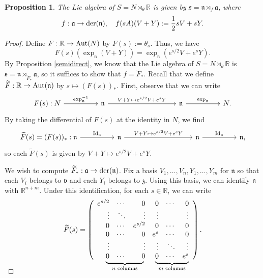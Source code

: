 \documentclass{amsart}
\newcommand{\R}{\mathbb R}
\newcommand{\id}{\text{\normalfont Id}}
\newcommand{\der}{\text{\normalfont der}}
\newcommand{\aut}{\text{\normalfont Aut}}
\newcommand{\s}{\mathfrak s}
\renewcommand{\v}{\mathfrak v}
\newcommand{\z}{\mathfrak z}
\newcommand{\n}{\mathfrak n}
\renewcommand{\a}{\mathfrak a}
\theoremstyle{plain}
\newtheorem{proposition}[theorem]{Proposition}
\theoremstyle{definition}
\theoremstyle{remark}
\newcommand\undermat[2]{%
	\makebox[0pt][l]{$\smash{\underbrace{\phantom{%
					\begin{matrix}#2\end{matrix}}}_{\text{$#1$}}}$}#2}
\begin{document}
	 \begin{proposition}
	 	\label{semidirect product}
	 	The Lie algebra of $S= N \rtimes_\theta \R$ is given by $\s = \n \rtimes_{f} \a$, where 
	 	$$f:\a \rightarrow \der(\n), \quad f(sA)(V+Y) := \frac12 sV + sY.$$
	 \end{proposition}
	 \begin{proof}
	 	Define $F:\R \rightarrow \aut(N)$ by $F(s) := \theta_s$. Thus, we have 
	 	$$F(s)(\exp_\n(V+Y)) = \exp_\n(e^{s/2}V + e^sY).$$
	 	By Proposition \ref{semidirect}, we know that the Lie algebra of $S = N \rtimes_\theta \R$ is $\s = \n \rtimes_{\widetilde F_*} \a$, so it suffices to show that $f = \widetilde F_*$. Recall that we define $\widetilde F:\R \rightarrow \aut(\n)$ by $s \mapsto (F(s))_*$. First, observe that we can write 
	 	$$\begin{tikzcd}
	 		F(s):N \arrow{rr}{\exp_\n^{-1}}&& \n \arrow{rrrr}{V+Y\mapsto e^{s/2}V + e^s Y} &&&& \n \arrow{rr}{\exp_\n} && N.
	 	\end{tikzcd}$$
 		By taking the differential of $F(s)$ at the identity in $N$, we find 
 		$$\begin{tikzcd}
 			\widetilde F(s) = (F(s))_*:\n \arrow{rr}{\id_\n}&& \n \arrow{rrrr}{V+Y\mapsto e^{s/2}V + e^s Y} &&&& \n \arrow{rr}{\id_\n} && \n,
 		\end{tikzcd}$$
 		so each $\widetilde F(s)$ is given by $V+Y \mapsto e^{s/2}V + e^s Y$. 
 		
 		We wish to compute $\widetilde F_*:\a \rightarrow \der(\n)$. Fix a basis $V_1,\ldots,V_n,Y_1,\ldots,Y_m$ for $\n$ so that each $V_i$ belongs to $\v$ and each $Y_i$ belongs to $\z$. Using this basis, we can identify $\n$ with $\R^{n+m}$. Under this identification, for each $s \in \R$, we can write 
 		$$\widetilde F(s) = \left(\begin{array}{rrrrrr}
 			e^{s/2} &\cdots&0&0&\cdots&0 \\
 			\vdots& \ddots &\vdots&\vdots&&\vdots \\
 			0&\cdots& e^{s/2} &0&\cdots&0 \\
 			0&\cdots& 0& e^s &\cdots& 0\\
 			\vdots&&\vdots&\vdots& \ddots &\vdots \\
 			\undermat{n\text{ columns}}{0&\cdots&0 &} \undermat{m\text{ columns}}{0&\cdots& e^s}
 		\end{array}\right).$$
 		\vspace{5mm}
 	

\end{proof}
\end{document}

